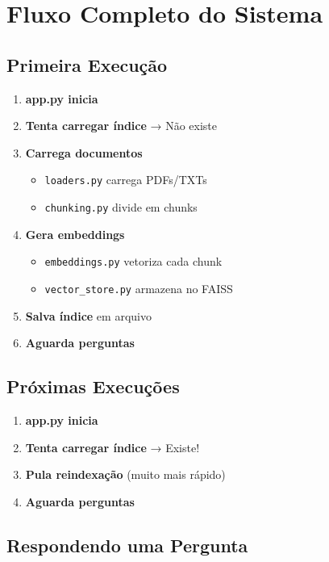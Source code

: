 \documentclass[12pt,a4paper]{article}
\begin{document}
\section{Fluxo Completo do Sistema}

\subsection{Primeira Execução}

\begin{enumerate}
    \item \textbf{app.py inicia}
    \item \textbf{Tenta carregar índice} → Não existe
    \item \textbf{Carrega documentos}
    \begin{itemize}
        \item \texttt{loaders.py} carrega PDFs/TXTs
        \item \texttt{chunking.py} divide em chunks
    \end{itemize}
    \item \textbf{Gera embeddings}
    \begin{itemize}
        \item \texttt{embeddings.py} vetoriza cada chunk
        \item \texttt{vector\_store.py} armazena no FAISS
    \end{itemize}
    \item \textbf{Salva índice} em arquivo
    \item \textbf{Aguarda perguntas}
\end{enumerate}

\subsection{Próximas Execuções}

\begin{enumerate}
    \item \textbf{app.py inicia}
    \item \textbf{Tenta carregar índice} → Existe!
    \item \textbf{Pula reindexação} (muito mais rápido)
    \item \textbf{Aguarda perguntas}
\end{enumerate}

\subsection{Respondendo uma Pergunta}
\end{document}
